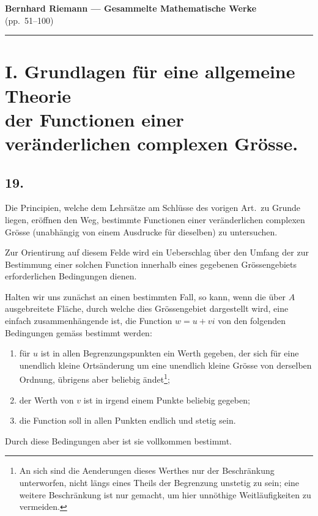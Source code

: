 \documentclass[12pt,a4paper]{article}
\begin{document}

\begin{center}
{\LARGE\bfseries Bernhard Riemann --- Gesammelte Mathematische Werke}\\[0.5em]
{\large (pp.~51--100)}\\[1em]
\rule{\textwidth}{0.4pt}
\end{center}

\vspace{1em}


\section*{I. Grundlagen für eine allgemeine Theorie\\
der Functionen einer veränderlichen complexen Grösse.}


\subsection*{19.}

Die Principien, welche dem Lehrsätze am Schlüsse des vorigen Art.\ zu Grunde liegen, eröffnen den Weg, bestimmte Functionen einer veränderlichen complexen Grösse (unabhängig von einem Ausdrucke für dieselben) zu untersuchen.

Zur Orientirung auf diesem Felde wird ein Ueberschlag über den Umfang der zur Bestimmung einer solchen Function innerhalb eines gegebenen Grössengebiets erforderlichen Bedingungen dienen.

Halten wir uns zunächst an einen bestimmten Fall, so kann, wenn die über $A$ ausgebreitete Fläche, durch welche dies Grössengebiet dargestellt wird, eine einfach zusammenhängende ist, die Function $w = u + vi$ von den folgenden Bedingungen gemäss bestimmt werden:
\begin{enumerate}
\item für $u$ ist in allen Begrenzungspunkten ein Werth gegeben, der sich für eine unendlich kleine Ortsänderung um eine unendlich kleine Grösse von derselben Ordnung, übrigens aber beliebig ändet\footnote{An sich sind die Aenderungen dieses Werthes nur der Beschränkung unterworfen, nicht längs eines Theils der Begrenzung unstetig zu sein; eine weitere Beschränkung ist nur gemacht, um hier unnöthige Weitläufigkeiten zu vermeiden.};
\item der Werth von $v$ ist in irgend einem Punkte beliebig gegeben;
\item die Function soll in allen Punkten endlich und stetig sein.
\end{enumerate}
Durch diese Bedingungen aber ist sie vollkommen bestimmt.
\end{document}
